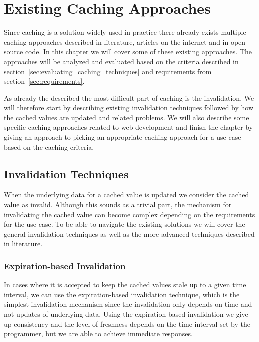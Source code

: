 \chapter{Existing Caching Approaches}
\label{chapter:caching}

Since caching is a solution widely used in practice there already exists multiple caching approaches described in literature, articles on the internet and in open source code. In this chapter we will cover some of these existing approaches. The approaches will be analyzed and evaluated based on the criteria described in section~\ref{sec:evaluating_caching_techniques} and requirements from section~\ref{sec:requirements}.

As already the described the most difficult part of caching is the invalidation. We will therefore start by describing existing invalidation techniques followed by how the cached values are updated and related problems. We will also describe some specific caching approaches related to web development and finish the chapter by giving an approach to picking an appropriate caching approach for a use case based on the caching criteria.

\section{Invalidation Techniques}
\label{sec:invalidation_techniques}

When the underlying data for a cached value is updated we consider the cached value as invalid. Although this sounds as a trivial part, the mechanism for invalidating the cached value can become complex depending on the requirements for the use case. To be able to navigate the existing solutions we will cover the general invalidation techniques as well as the more advanced techniques described in literature.


\subsection{Expiration-based Invalidation}
\label{subsec:expiration_based_invalidation}

In cases where it is accepted to keep the cached values stale up to a given time interval, we can use the expiration-based invalidation technique, which is the simplest invalidation mechanism since the invalidation only depends on time and not updates of underlying data. Using the expiration-based invalidation we give up consistency and the level of freshness depends on the time interval set by the programmer, but we are able to achieve immediate responses.

